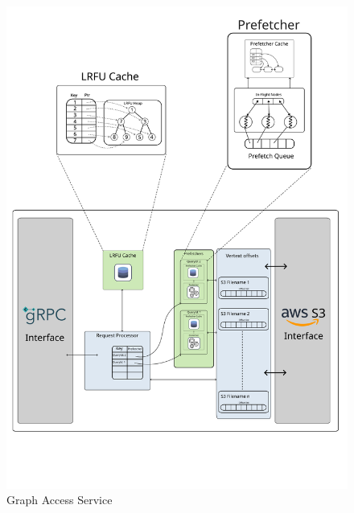 \begin{figure}[ht]
    \centering
    \includegraphics[width=\textwidth]{figures/graphAccessServiceFinal.png}
    \caption{Graph Access Service}
    \label{fig:graphAccessArch}
\end{figure}

